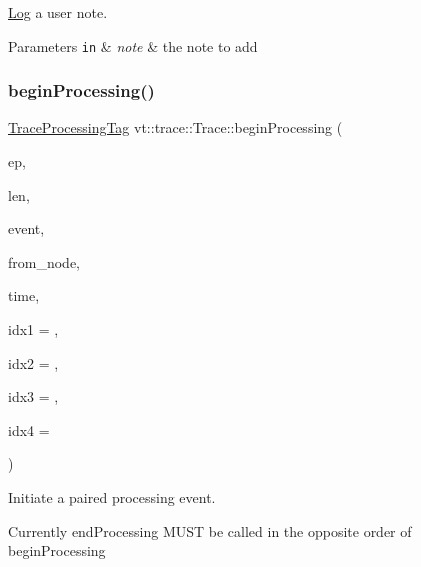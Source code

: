 \hyperlink{structvt_1_1trace_1_1_log}{Log} a user note. 


\begin{DoxyParams}[1]{Parameters}
\mbox{\tt in}  & {\em note} & the note to add \\
\hline
\end{DoxyParams}
\mbox{\label{structvt_1_1trace_1_1_trace_ad483e7ced77aedcfd047e3d892e0191f}} 
\subsubsection{\texorpdfstring{begin\+Processing()}{beginProcessing()}}
{\footnotesize\ttfamily \hyperlink{structvt_1_1trace_1_1_trace_processing_tag}{Trace\+Processing\+Tag} vt\+::trace\+::\+Trace\+::begin\+Processing (\begin{DoxyParamCaption}\item[{\hyperlink{namespacevt_1_1trace_a3c14050715ba9eceaeff51fb3de64f2f}{Trace\+Entry\+I\+D\+Type} const}]{ep,  }\item[{\hyperlink{namespacevt_1_1trace_aeb598f45d67d41db7902e494f2f0ce59}{Trace\+Msg\+Len\+Type} const}]{len,  }\item[{\hyperlink{namespacevt_1_1trace_a64a7185f3e102df8d8258f263ccd1582}{Trace\+Event\+I\+D\+Type} const}]{event,  }\item[{\hyperlink{namespacevt_a866da9d0efc19c0a1ce79e9e492f47e2}{Node\+Type} const}]{from\+\_\+node,  }\item[{\hyperlink{namespacevt_a2b9f28078dc309ad0706b69ded743e69}{Time\+Type} const}]{time,  }\item[{uint64\+\_\+t const}]{idx1 = {},  }\item[{uint64\+\_\+t const}]{idx2 = {},  }\item[{uint64\+\_\+t const}]{idx3 = {},  }\item[{uint64\+\_\+t const}]{idx4 = {} }\end{DoxyParamCaption})}



Initiate a paired processing event. 

Currently {\ttfamily end\+Processing} M\+U\+ST be called in the opposite order of {\ttfamily begin\+Processing} 


